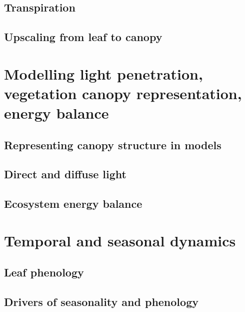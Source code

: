 \documentclass[]{book}
\begin{document}
\section{Transpiration}\label{transpiration}

\section{Upscaling from leaf to
canopy}\label{upscaling-from-leaf-to-canopy}

\chapter{Modelling light penetration, vegetation canopy representation,
energy
balance}\label{modelling-light-penetration-vegetation-canopy-representation-energy-balance}


\section{Representing canopy structure in
models}\label{representing-canopy-structure-in-models}

\section{Direct and diffuse light}\label{direct-and-diffuse-light}

\section{Ecosystem energy balance}\label{ecosystem-energy-balance}

\chapter{Temporal and seasonal
dynamics}\label{temporal-and-seasonal-dynamics}


\section{Leaf phenology}\label{leaf-phenology}

\section{Drivers of seasonality and
phenology}\label{drivers-of-seasonality-and-phenology}
\end{document}
